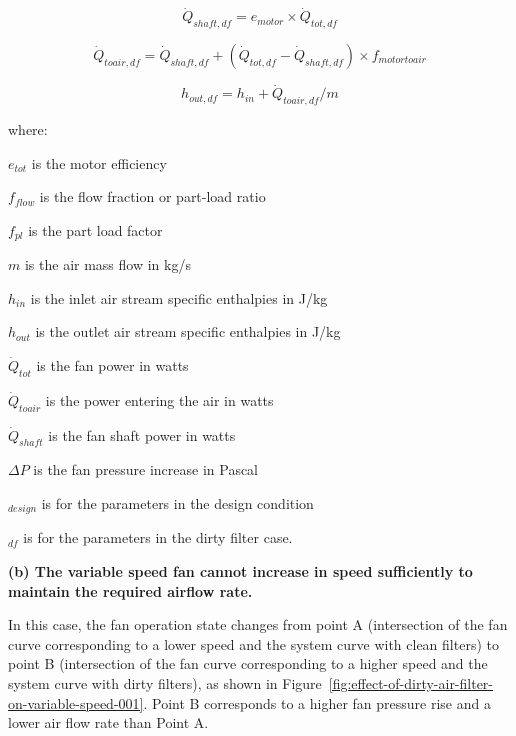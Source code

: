 \begin{equation}
\dot{Q}_{shaft,df} = e_{motor} \times \dot{Q}_{tot, df}
\end{equation}

\begin{equation}
\dot{Q}_{toair,df} = \dot{Q}_{shaft,df} +( \dot{Q}_{tot,df} - \dot{Q}_{shaft,df}) \times f_{motortoair}
\end{equation}

\begin{equation}
h_{out,df} = h_{in} + \dot{Q}_{toair,df} / m
\end{equation}

where:

\(e_{tot}\) is the motor efficiency

\(f_{flow}\) is the flow fraction or part-load ratio

\(f_{pl}\) is the part load factor

\(m\) is the air mass flow in kg/s

\(h_{in}\) is the inlet air stream specific enthalpies in J/kg

\(h_{out}\) is the outlet air stream specific enthalpies in J/kg

\(\dot{Q}_{tot}\) is the fan power in watts

\(\dot{Q}_{toair}\) is the power entering the air in watts

\(\dot{Q}_{shaft}\) is the fan shaft power in watts

\(\Delta P\) is the fan pressure increase in Pascal

\(_{design}\) is for the parameters in the design condition

\(_{df}\) is for the parameters in the dirty filter case.

\textbf{(b) The variable speed fan cannot increase in speed sufficiently to maintain the required airflow rate.}

In this case, the fan operation state changes from point A (intersection of the fan curve corresponding to a lower speed and the system curve with clean filters) to point B (intersection of the fan curve corresponding to a higher speed and the system curve with dirty filters), as shown in Figure~\ref{fig:effect-of-dirty-air-filter-on-variable-speed-001}. Point B corresponds to a higher fan pressure rise and a lower air flow rate than Point A.

